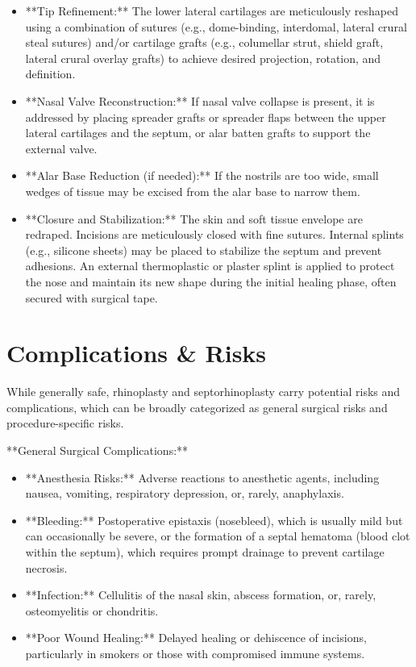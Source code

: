 \begin{itemize}
  \item **Tip Refinement:** The lower lateral cartilages are meticulously reshaped using a combination of sutures (e.g., dome-binding, interdomal, lateral crural steal sutures) and/or cartilage grafts (e.g., columellar strut, shield graft, lateral crural overlay grafts) to achieve desired projection, rotation, and definition.
  
  \item **Nasal Valve Reconstruction:** If nasal valve collapse is present, it is addressed by placing spreader grafts or spreader flaps between the upper lateral cartilages and the septum, or alar batten grafts to support the external valve.
  
  \item **Alar Base Reduction (if needed):** If the nostrils are too wide, small wedges of tissue may be excised from the alar base to narrow them.
  
  \item **Closure and Stabilization:** The skin and soft tissue envelope are redraped. Incisions are meticulously closed with fine sutures. Internal splints (e.g., silicone sheets) may be placed to stabilize the septum and prevent adhesions. An external thermoplastic or plaster splint is applied to protect the nose and maintain its new shape during the initial healing phase, often secured with surgical tape.
\end{itemize}

\section*{Complications \& Risks}
While generally safe, rhinoplasty and septorhinoplasty carry potential risks and complications, which can be broadly categorized as general surgical risks and procedure-specific risks.

**General Surgical Complications:**
\begin{itemize}
  \item **Anesthesia Risks:** Adverse reactions to anesthetic agents, including nausea, vomiting, respiratory depression, or, rarely, anaphylaxis.
  
  \item **Bleeding:** Postoperative epistaxis (nosebleed), which is usually mild but can occasionally be severe, or the formation of a septal hematoma (blood clot within the septum), which requires prompt drainage to prevent cartilage necrosis.
  
  \item **Infection:** Cellulitis of the nasal skin, abscess formation, or, rarely, osteomyelitis or chondritis.
  
  \item **Poor Wound Healing:** Delayed healing or dehiscence of incisions, particularly in smokers or those with compromised immune systems.
\end{itemize}

